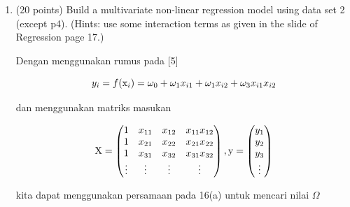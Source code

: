 \documentclass[12pt]{article}%
\begin{document}
\begin{enumerate}
\begin{enumerate}
		\item (20 points) Build a multivariate non-linear regression model using data set 2 (except p4). (Hints: use some interaction terms as given in the slide of Regression page 17.)

		\par Dengan menggunakan rumus pada [5]

		\[y_i = f(\textup{x}_i) = \omega_0 + \omega_1x_{i1} + \omega_1x_{i2} + \omega_3x_{i1}x_{i2}\]

		\par dan menggunakan matriks masukan

		\[\textup{X} = \begin{pmatrix} 1 & x_{11} & x_{12} & x_{11}x_{12}\\ 1 & x_{21} & x_{22} & x_{21}x_{22} \\ 1 & x_{31} & x_{32} & x_{31}x_{32} \\ \vdots & \vdots & \vdots &\vdots \end{pmatrix} , \textup{y} = \begin{pmatrix} y_1\\ y_2\\ y_3\\ \vdots \end{pmatrix}\]

		\par kita dapat menggunakan persamaan pada 16(a) untuk mencari nilai $\Omega$


\end{enumerate}
\end{enumerate}
\end{document}
